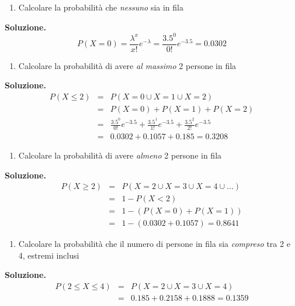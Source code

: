 \documentclass[
  11pt,
]{book}
\providecommand{\tightlist}{%
  \setlength{\itemsep}{0pt}\setlength{\parskip}{0pt}}
\theoremstyle{mytheoremstyle}
\theoremstyle{mydefstyle}
\begin{document}
\begin{enumerate}
\def\labelenumi{\arabic{enumi}.}
\tightlist
\item
  Calcolare la probabilità che \emph{nessuno} sia in fila
\end{enumerate}

\textbf{Soluzione.}
\[P(X=0)=\frac{\lambda^x}{x!}e^{-\lambda}=\frac{3.5^0}{0!}e^{-3.5}=0.0302\]

\begin{enumerate}
\def\labelenumi{\arabic{enumi}.}
\setcounter{enumi}{1}
\tightlist
\item
  Calcolare la probabilità di avere \emph{al massimo} 2 persone in fila
\end{enumerate}

\textbf{Soluzione.}
\begin{eqnarray*}
P(X\leq 2) &=& P(X=0\cup X=1 \cup X=2)\\
           &=& P(X=0)+P(X=1)+P(X=2)\\
           &=& \frac{3.5^0}{0!}e^{-3.5}+\frac{3.5^1}{1!}e^{-3.5}+\frac{3.5^2}{2!}e^{-3.5}\\
           &=& 0.0302 + 0.1057 + 0.185 = 0.3208
\end{eqnarray*}

\begin{enumerate}
\def\labelenumi{\arabic{enumi}.}
\setcounter{enumi}{2}
\tightlist
\item
  Calcolare la probabilità di avere \emph{almeno} 2 persone in fila
\end{enumerate}

\textbf{Soluzione.}
\begin{eqnarray*}
P(X\geq 2) &=& P(X=2\cup X=3 \cup X=4 \cup ...)\\
           &=& 1 - P(X<2)\\
           &=& 1-(P(X=0)+P(X=1))\\
           &=& 1-(0.0302 + 0.1057) = 0.8641
\end{eqnarray*}

\begin{enumerate}
\def\labelenumi{\arabic{enumi}.}
\setcounter{enumi}{3}
\tightlist
\item
  Calcolare la probabilità che il numero di persone in fila sia \emph{compreso} tra 2 e 4, estremi inclusi
\end{enumerate}

\textbf{Soluzione.}
\begin{eqnarray*}
P(2\leq X\leq 4) &=& P(X=2\cup X=3 \cup X=4 )\\
           &=& 0.185 + 0.2158+ 0.1888= 0.1359
\end{eqnarray*}
\end{document}
